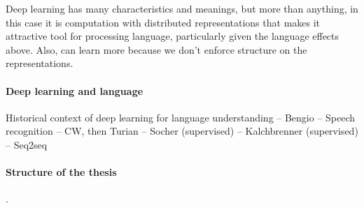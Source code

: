 Deep learning has many characteristics and meanings, but more than anything, in this case it is computation with distributed representations that makes it attractive tool for processing language, particularly given the language effects above. Also, can learn more because we don't enforce structure on the representations. 

\paragraph{Deep learning and language} 

Historical context of deep learning for language understanding
-- Bengio
-- Speech recognition
-- CW, then Turian
-- Socher (supervised)
-- Kalchbrenner (supervised)
-- Seq2seq

\paragraph{Structure of the thesis}. 
